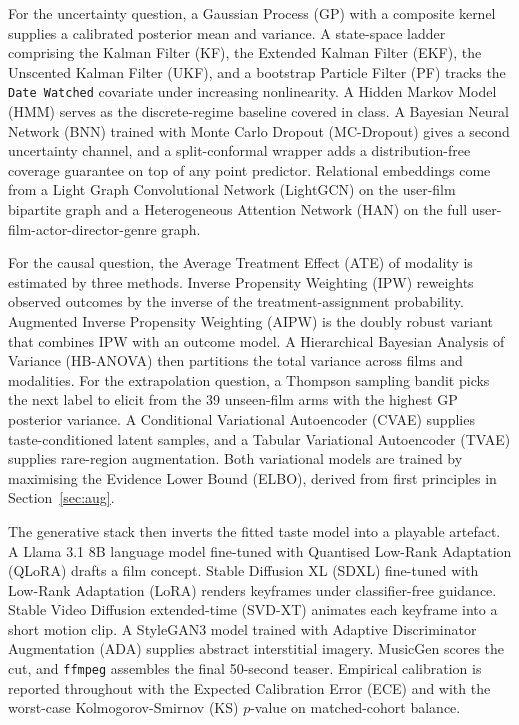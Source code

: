 \documentclass{article}
\begin{document}
For the uncertainty question, a Gaussian Process (GP) with a composite kernel supplies a calibrated posterior mean and variance. A state-space ladder comprising the Kalman Filter (KF), the Extended Kalman Filter (EKF), the Unscented Kalman Filter (UKF), and a bootstrap Particle Filter (PF) tracks the \texttt{Date Watched} covariate under increasing nonlinearity. A Hidden Markov Model (HMM) serves as the discrete-regime baseline covered in class. A Bayesian Neural Network (BNN) trained with Monte Carlo Dropout (MC-Dropout) gives a second uncertainty channel, and a split-conformal wrapper adds a distribution-free coverage guarantee on top of any point predictor. Relational embeddings come from a Light Graph Convolutional Network (LightGCN) on the user-film bipartite graph and a Heterogeneous Attention Network (HAN) on the full user-film-actor-director-genre graph.

For the causal question, the Average Treatment Effect (ATE) of modality is estimated by three methods. Inverse Propensity Weighting (IPW) reweights observed outcomes by the inverse of the treatment-assignment probability. Augmented Inverse Propensity Weighting (AIPW) is the doubly robust variant that combines IPW with an outcome model. A Hierarchical Bayesian Analysis of Variance (HB-ANOVA) then partitions the total variance across films and modalities. For the extrapolation question, a Thompson sampling bandit picks the next label to elicit from the 39 unseen-film arms with the highest GP posterior variance. A Conditional Variational Autoencoder (CVAE) supplies taste-conditioned latent samples, and a Tabular Variational Autoencoder (TVAE) supplies rare-region augmentation. Both variational models are trained by maximising the Evidence Lower Bound (ELBO), derived from first principles in Section~\ref{sec:aug}.

The generative stack then inverts the fitted taste model into a playable artefact. A Llama 3.1 8B language model fine-tuned with Quantised Low-Rank Adaptation (QLoRA) drafts a film concept. Stable Diffusion XL (SDXL) fine-tuned with Low-Rank Adaptation (LoRA) renders keyframes under classifier-free guidance. Stable Video Diffusion extended-time (SVD-XT) animates each keyframe into a short motion clip. A StyleGAN3 model trained with Adaptive Discriminator Augmentation (ADA) supplies abstract interstitial imagery. MusicGen scores the cut, and \texttt{ffmpeg} assembles the final 50-second teaser. Empirical calibration is reported throughout with the Expected Calibration Error (ECE) and with the worst-case Kolmogorov-Smirnov (KS) $p$-value on matched-cohort balance.
\end{document}
